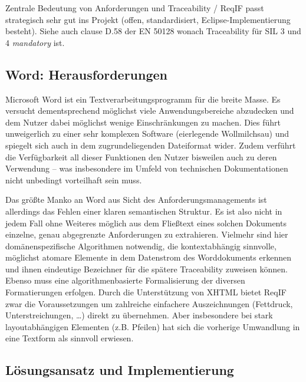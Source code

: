 \documentclass[twoside]{article}
\begin{document}
\begin{multicols}{2}
Zentrale Bedeutung von Anforderungen und Traceability / ReqIF passt strategisch sehr gut ins Projekt (offen, standardisiert, Eclipse-Implementierung besteht).
Siehe auch clause D.58 der EN 50128 wonach Traceability für SIL 3 und 4 \emph{mandatory} ist.

\subsection{Word: Herausforderungen}

Microsoft Word ist ein Textverarbeitungsprogramm für die breite Masse. Es versucht dementsprechend möglichst viele Anwendungsbereiche abzudecken und dem Nutzer dabei möglichst wenige Einschränkungen zu machen. Dies führt unweigerlich zu einer sehr komplexen Software (\glqq eierlegende Wollmilchsau\grqq ) und spiegelt sich auch in dem zugrundeliegenden Dateiformat wider. Zudem verführt die Verfügbarkeit all dieser Funktionen den Nutzer bisweilen auch zu deren Verwendung -- was insbesondere im Umfeld von technischen Dokumentationen nicht unbedingt vorteilhaft sein muss.

Das größte Manko an Word aus Sicht des Anforderungsmanagements ist allerdings das Fehlen einer klaren semantischen Struktur. Es ist also nicht in jedem Fall ohne Weiteres möglich aus dem Fließtext eines solchen Dokuments einzelne, genau abgegrenzte Anforderungen zu extrahieren. Vielmehr sind hier domänenspezifische Algorithmen notwendig, die kontextabhängig sinnvolle, möglichst atomare Elemente in dem Datenstrom des Worddokuments erkennen und ihnen eindeutige Bezeichner für die spätere Traceability zuweisen können. Ebenso muss eine algorithmenbasierte Formalisierung der diversen Formatierungen erfolgen. Durch die Unterstützung von XHTML bietet ReqIF zwar die Voraussetzungen um zahlreiche einfachere Auszeichnungen (Fettdruck, Unterstreichungen, \ldots ) direkt zu übernehmen. Aber insbesondere bei stark layoutabhängigen Elementen (z.B. Pfeilen) hat sich die vorherige Umwandlung in eine Textform als sinnvoll erwiesen.

\subsection{Lösungsansatz und Implementierung}


\end{multicols}
\end{document}
